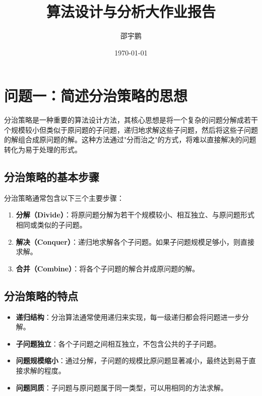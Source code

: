 \documentclass[12pt]{article}
\title{算法设计与分析大作业报告}
\author{邵宇鹏}
\date{\today}
\begin{document}
\maketitle
\section{问题一：简述分治策略的思想}

分治策略是一种重要的算法设计方法，其核心思想是将一个复杂的问题分解成若干个规模较小但类似于原问题的子问题，递归地求解这些子问题，然后将这些子问题的解组合成原问题的解。这种方法通过"分而治之"的方式，将难以直接解决的问题转化为易于处理的形式。

\subsection{分治策略的基本步骤}

分治策略通常包含以下三个主要步骤：

\begin{enumerate}
\item \textbf{分解（Divide）}：将原问题分解为若干个规模较小、相互独立、与原问题形式相同或类似的子问题。


\item \textbf{解决（Conquer）}：递归地求解各个子问题。如果子问题规模足够小，则直接求解。

\item \textbf{合并（Combine）}：将各个子问题的解合并成原问题的解。
\end{enumerate}

\subsection{分治策略的特点}

\begin{itemize}
\item \textbf{递归结构}：分治算法通常使用递归来实现，每一级递归都会将问题进一步分解。


\item \textbf{子问题独立}：各个子问题之间相互独立，不包含公共的子子问题。

\item \textbf{问题规模缩小}：通过分解，子问题的规模比原问题显著减小，最终达到易于直接求解的程度。

\item \textbf{问题同质}：子问题与原问题属于同一类型，可以用相同的方法求解。
\end{itemize}
\end{document}

